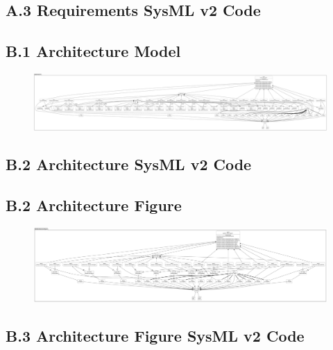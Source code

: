 \subsection*{A.3 Requirements SysML v2 Code}


\subsection*{B.1 Architecture Model}
\begin{figure}[H]
  \centering
  \includegraphics[width=\linewidth]{ressources/MAS/diagrams/MASArchitecture.pdf}\label{fig:arch}
\end{figure}

\subsection*{B.2 Architecture SysML v2 Code}


\subsection*{B.2 Architecture Figure}
\begin{figure}[H]
  \centering
  \includegraphics[width=\linewidth]{ressources/MAS/diagrams/MASArchitecture_Figure.pdf}\label{fig:arch-fig}
\end{figure}

\subsection*{B.3 Architecture Figure SysML v2 Code}


